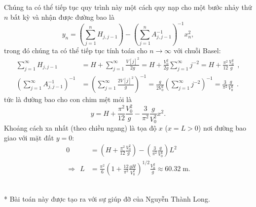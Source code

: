 \begin{solution}
Chúng ta có thể tiếp tục quy trình này một cách quy nạp cho một bước nhảy thứ $n$ bất kỳ và nhận được đường bao là
\[y_n=\left(\sum_{j=1}^{n}H_{j,j-1}\right)-\left(\sum_{j=1}^{n}A_{j,j-1}^{-1}\right)^{-1}x_n^2,\]
trong đó chúng ta có thể tiếp tục tính toán cho $n\rightarrow \infty$ với chuỗi Basel:
\begin{equation}
\begin{split}
\sum^{\infty}_{j=1} H_{j,j-1} &= H + \sum^{\infty}_{j=1}\frac{V[j]^2}{2g} = H + \frac{V_0^2}{2g} \sum^{\infty}_{j=1} j^{-2} = H + \frac{\pi^2}{12} \frac{V_0^2}{g} \ \ ,
\\
\left( \sum^{\infty}_{j=1} A_{j,j-1}^{-1} \right)^{-1} &= \left( \sum^{\infty}_{j=1} \frac{2V[j]^2}{g} \right)^{-1} = \frac{g}{2V_0^2}\left( \sum^{\infty}_{j=1} j^{-2} \right)^{-1} = \frac{3}{\pi^2} \frac{g}{V_0^2} \ \ .
\end{split}
\end{equation}
tức là đường bao cho con chim mệt mỏi là
\[y=H+\frac{\pi^2}{12}\frac{V_0^2}{g}-\frac{3}{\pi^2}\frac{g}{V_0^2}x^2.\]
Khoảng cách xa nhất (theo chiều ngang) là tọa độ $x$ ($x=L>0$) nơi đường bao giao với mặt đất $y=0$:
\begin{equation}
\begin{split}
0&=\left( H + \frac{\pi^2}{12} \frac{V_0^2}{g} \right) - \left( \frac{3}{\pi^2} \frac{g}{V_0^2} \right) L^2
\\
\Longrightarrow \ \ L &= \frac{\pi^2}{6} \left(1 + \frac{12}{\pi^2} \frac{gH}{V_0^2} \right)^{1/2} \frac{V_0^2}{g} \approx \boxed{60.32\;\mathrm{m}}.
\end{split}
\end{equation}
\ \ 


* Bài toán này được tạo ra với sự giúp đỡ của Nguyễn Thành Long.

\end{solution}
